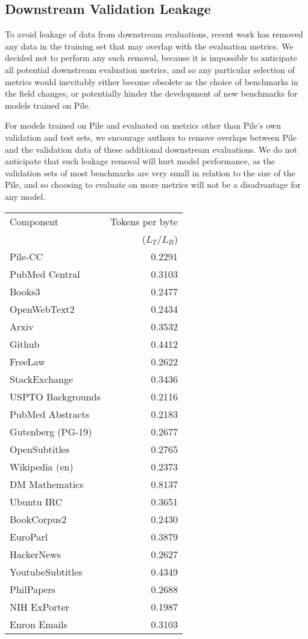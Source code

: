 \documentclass[11pt,a4paper]{article}
\begin{document}
\begin{appendices}
\subsection{Downstream Validation Leakage}

To avoid leakage of data from downstream evaluations, recent work \citep{GPT2,GPT3,Megatron} has removed any data in the training set that may overlap with the evaluation metrics. We decided not to perform any such removal, because it is impossible to anticipate all potential downstream evaluation metrics, and so any particular selection of metrics would inevitably either become obsolete as the choice of benchmarks in the field changes, or potentially hinder the development of new benchmarks for models trained on Pile.

For models trained on Pile and evaluated on metrics other than Pile's own validation and test sets, we encourage authors to remove overlaps between Pile and the validation data of these additional downstream evaluations. We do not anticipate that such leakage removal will hurt model performance, as the validation sets of most benchmarks are very small in relation to the size of the Pile, and so choosing to evaluate on more metrics will not be a disadvantage for any model.


\begin{table}[t]

    \centering
    \begin{tabular}{l r}
    \toprule
        Component & Tokens per byte \\ & ($L_T/L_B$)
        \\
        \midrule
Pile-CC & 0.2291 \\
PubMed Central & 0.3103 \\
Books3 & 0.2477 \\
OpenWebText2 & 0.2434 \\
Arxiv & 0.3532 \\
Github & 0.4412 \\
FreeLaw & 0.2622 \\
StackExchange & 0.3436 \\
USPTO Backgrounds & 0.2116 \\
PubMed Abstracts & 0.2183 \\
Gutenberg (PG-19) & 0.2677 \\
OpenSubtitles & 0.2765 \\
Wikipedia (en) & 0.2373 \\
DM Mathematics & 0.8137 \\
Ubuntu IRC & 0.3651 \\
BookCorpus2 & 0.2430 \\
EuroParl & 0.3879 \\
HackerNews & 0.2627 \\
YoutubeSubtitles & 0.4349 \\
PhilPapers & 0.2688 \\
NIH ExPorter & 0.1987 \\
Enron Emails & 0.3103 \\
        \bottomrule
    \end{tabular}


\end{table}
\end{appendices}
\end{document}
